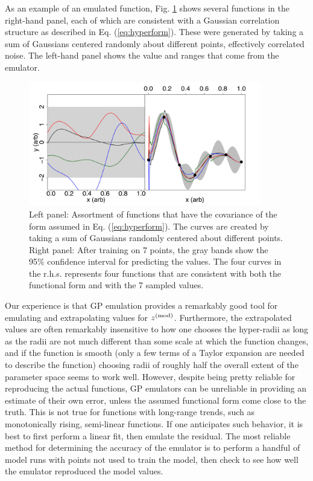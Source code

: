 As an example of an emulated function, Fig. \ref{fig:emuexample} shows several functions in the right-hand panel, each of which are consistent with a Gaussian correlation structure as described in Eq. (\ref{eq:hyperform}). These were generated by taking a sum of Gaussians centered randomly about different points, effectively correlated noise. The left-hand panel shows the value and ranges that come from the emulator.
\begin{figure}
\includegraphics[width=4in]{figs/gaussian-reals-joined.pdf}
\parbox[b]{3.0in}{\caption{\label{fig:emuexample}
Left panel: Assortment of functions that have the covariance of the form assumed in Eq. (\ref{eq:hyperform}). The curves are created by taking a sum of Gaussians randomly centered about different points. Right panel: After training on 7 points, the gray bands show the 95\% confidence interval for predicting the values. The four curves in the r.h.s. represents four functions that are consistent with both the functional form and with the 7 sampled values.}}
\end{figure}

Our experience is that GP emulation provides a remarkably good tool for emulating and extrapolating values for $z^{\rm(mod)}$. Furthermore, the extrapolated values are often remarkably insensitive to how one chooses the hyper-radii as long as the radii are not much different than some scale at which the function changes, and if the function is smooth (only a few terms of a Taylor expansion are needed to describe the function) choosing radii of roughly half the overall extent of the parameter space seems to work well. However, despite being pretty reliable for reproducing the actual functions, GP emulators can be unreliable in providing an estimate of their own error, unless the assumed functional form come close to the truth. This is not true for functions with long-range trends, such as monotonically rising, semi-linear functions. If one anticipates such behavior, it is best to first perform a linear fit, then emulate the residual. The most reliable method for determining the accuracy of the emulator is to perform a handful of model runs with points not used to train the model, then check to see how well the emulator reproduced the model values.






